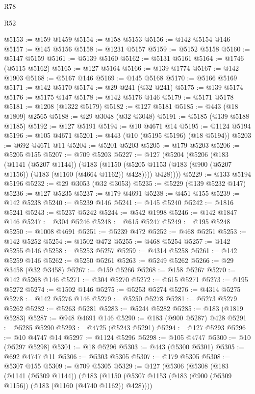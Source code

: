 \begin{lexlean}{R78}
\begin{lexlean}{R52}
\begin{coremodule}
{{{{{{{{{{{{{{{{{{{{{{{{{{{{{{{{{{{{{{{{{{{{{{{{{{{{{{{{{{{{{{{{{{{{{{{{{{{{{{{{{{{{{{{{{{{{{{{{{{{{{{{{{{{{{{{{{{{{{{{{{{{{{{{{{{{{{{{{{{{{{{{{{{{{{{{{{{{{{{{{{{{{{{{{{{{{{{{{{{{{{{{{{{{{{{{{{{{{{{@5153 := @159 @1459
@5154 := @158 @5153
@5156 := @142 @5154 @146
@5157 := @145 @5156
@5158 := @1231 @5157
@5159 := @5152 @5158
@5160 := @5147 @5159
@5161 := @5139 @5160
@5162 := @5131 @5161
@5164 := @1746 (@5115 @5162)
@5165 := @127 @5164
@5166 := @139 @1774
@5167 := @142 @1903
@5168 := @5167 @146
@5169 := @145 @5168
@5170 := @5166 @5169
@5171 := @142 @5170
@5174 := @29 @241 (@32 @241)
@5175 := @139 @5174
@5176 := @5175 @147
@5178 := @142 @5176 @146
@5179 := @5171 @5178
@5181 := @1208 (@1322 @5179)
@5182 := @127 @5181
@5185 := @443 (@18 @1809) @2565
@5188 := @29 @3048 (@32 @3048)
@5191 := @5185 (@139 @5188 @1185)
@5192 := @127 @5191
@5194 := @10 @4671 @14
@5195 := @1124 @5194
@5196 := @105 @4671
@5201 := @443 (@10 (@5195 @5196) (@18 @5194))
@5203 := @692 @4671 @11
@5204 := @5201 @5203
@5205 := @179 @5203
@5206 := @5205 @155
@5207 := @709 @5203
@5227 := @127
    (@5204
      (@5206
        (@183
          (@1141 (@5207 @1144))
          (@183
            (@1150 (@5205 @1153 (@183 (@900 (@5207 @1156)) (@183 (@1160 (@4664 @1162)) @428))))
            @428))))
@5229 := @133 @5194 @5196
@5232 := @29 @3053 (@32 @3053)
@5235 := @5229 (@139 @5232 @147)
@5236 := @127 @5235
@5237 := @179 @4691
@5238 := @451 @155
@5239 := @142 @5238
@5240 := @5239 @146
@5241 := @145 @5240
@5242 := @1816 @5241
@5243 := @5237 @5242
@5244 := @542 @1998
@5246 := @142 @1847 @146
@5247 := @304 @5246
@5248 := @615 @5247
@5249 := @195 @5248
@5250 := @1008 @4691
@5251 := @5239 @472
@5252 := @468 @5251
@5253 := @142 @5252
@5254 := @1502 @472
@5255 := @468 @5254
@5257 := @142 @5255 @146
@5258 := @5253 @5257
@5259 := @4314 @5258
@5261 := @142 @5259 @146
@5262 := @5250 @5261
@5263 := @5249 @5262
@5266 := @29 @3458 (@32 @3458)
@5267 := @159 @5266
@5268 := @158 @5267
@5270 := @142 @5268 @146
@5271 := @304 @5270
@5272 := @615 @5271
@5273 := @195 @5272
@5274 := @1502 @146
@5275 := @5253 @5274
@5276 := @4314 @5275
@5278 := @142 @5276 @146
@5279 := @5250 @5278
@5281 := @5273 @5279 @5262
@5282 := @5263 @5281
@5283 := @5244 @5282
@5285 := @183 (@1819 @5283)
@5287 := @948 @4691 @146
@5290 := @183 (@900 @5287) @428
@5291 := @5285 @5290
@5293 := @4725 (@5243 @5291)
@5294 := @127 @5293
@5296 := @10 @4747 @14
@5297 := @1124 @5296
@5298 := @105 @4747
@5300 := @10 (@5297 @5298)
@5301 := @18 @5296
@5303 := @443 (@5300 @5301)
@5305 := @692 @4747 @11
@5306 := @5303 @5305
@5307 := @179 @5305
@5308 := @5307 @155
@5309 := @709 @5305
@5329 := @127
    (@5306
      (@5308
        (@183
          (@1141 (@5309 @1144))
          (@183
            (@1150 (@5307 @1153 (@183 (@900 (@5309 @1156)) (@183 (@1160 (@4740 @1162)) @428))))
}}}}}}}}}}}}}}}}}}}}}}}}}}}}}}}}}}}}}}}}}}}}}}}}}}}}}}}}}}}}}}}}}}}}}}}}}}}}}}}}}}}}}}}}}}}}}}}}}}}}}}}}}}}}}}}}}}}}}}}}}}}}}}}}}}}}}}}}}}}}}}}}}}}}}}}}}}}}}}}}}}}}}}}}}}}}}}}}}}}}}}}}}}}}}}}}}}}}}}
\end{coremodule}
\end{lexlean}
\end{lexlean}
